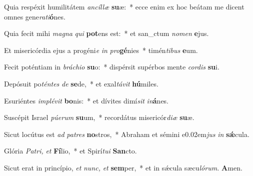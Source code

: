 \item Quia respéxit humilitátem \textit{ancíllæ} \textbf{su}æ:~* ecce enim ex hoc beátam me dicent omnes gene\textit{rati}\textbf{ó}nes.
\item Quia fecit mihi \textit{magna} \textit{qui} \textbf{pot}ens est:~* et san\_ctum \textit{nomen} \textbf{e}jus.
\item Et misericórdia ejus a progéni\textit{e} \textit{in} \textit{pro}\textbf{gé}nies~* timén\textit{tibus} \textbf{e}um.
\item Fecit poténtiam in \textit{bráchio} \textbf{su}o:~* dispérsit supérbos mente \textit{cordis} \textbf{su}i.
\item Depósuit po\textit{téntes} \textit{de} \textbf{se}de,~* et exal\textit{távit} \textbf{hú}miles.
\item Esuriéntes \textit{implévit} \textbf{bo}nis:~* et dívites dimí\tinyhspace\textit{sit} \textit{in}\textbf{á}nes.
\item Suscépit Israel \textit{púerum} \textbf{su}um,~* recordátus misericór\textit{diæ} \textbf{su}æ.
\item Sicut locútus est \textit{ad} \textit{patres} \textbf{no}stros,~* Abraham et sémini e\kern 0.02em\textit{jus} \textit{in} \textbf{sǽ}cula.
\item Glória \textit{Patri,} \textit{et} \textbf{Fí}lio,~* et Spirí\tinyhspace\textit{tu}\textit{i} \textbf{San}cto.
\item Sicut erat in princípio, \textit{et} \textit{nunc,} \textit{et} \textbf{sem}per,~* et in sǽcula sæcu\tinyhspace\textit{lórum.} \textbf{A}men.